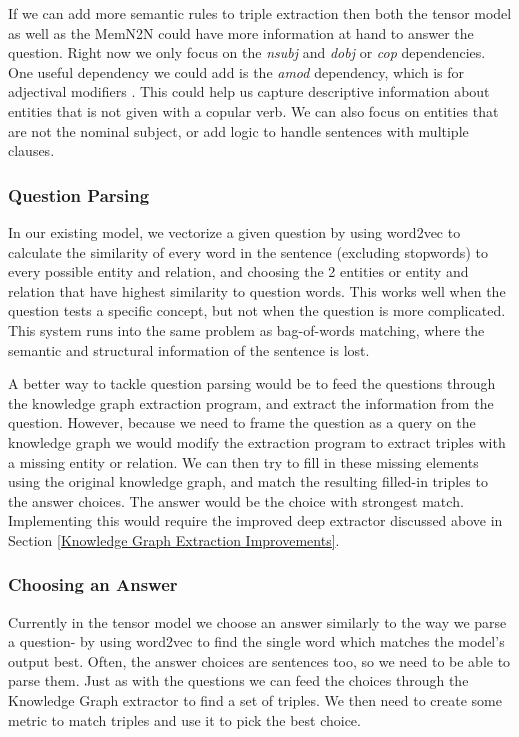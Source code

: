 \documentclass[pageno]{final_paper}
\begin{document}
If we can add more semantic rules to triple extraction then both the tensor
model as well as the MemN2N could have more information at hand to answer the
question. Right now we only focus on the \textit{nsubj} and \textit{dobj} or
\textit{cop} dependencies. One useful dependency we could add is the
\textit{amod} dependency, which is for adjectival modifiers \cite{De2014}. This
could help us capture descriptive information about entities that is not given
with a copular verb. We can also focus on entities that are not the nominal
subject, or add logic to handle sentences with multiple clauses.

\subsubsection{Question Parsing}
\label{Question Parsing}

In our existing model, we vectorize a given question by using word2vec to
calculate the similarity of every word in the sentence (excluding stopwords) to
every possible entity and relation, and choosing the 2 entities or entity and
relation that have highest similarity to question words. This works well when
the question tests a specific concept, but not when the question is more
complicated. This system runs into the same problem as bag-of-words matching,
where the semantic and structural information of the sentence is lost.

A better way to tackle question parsing would be to feed the questions through
the knowledge graph extraction program, and extract the information from the
question. However, because we need to frame the question as a query on the
knowledge graph we would modify the extraction program to extract triples with a
missing entity or relation. We can then try to fill in these missing elements
using the original knowledge graph, and match the resulting filled-in triples to
the answer choices. The answer would be the choice with strongest match.
Implementing this would require the improved deep extractor discussed above in
Section \ref{Knowledge Graph Extraction Improvements}.

\subsubsection{Choosing an Answer}
\label{Choosing an Answer}

Currently in the tensor model we choose an answer similarly to the way we parse
a question- by using word2vec to find the single word which matches the model's
output best. Often, the answer choices are sentences too, so we need to be able
to parse them. Just as with the questions we can feed the choices through the
Knowledge Graph extractor to find a set of triples. We then need to create some
metric to match triples and use it to pick the best choice.
\end{document}
